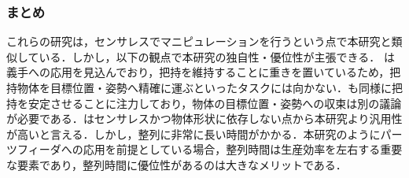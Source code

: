 \documentclass[a4paper,twoside,12pt,papersize, dvipdfmx]{iirthesis}
\begin{document}
\subsubsection{まとめ}
これらの研究は，センサレスでマニピュレーションを行うという点で本研究と類似している．しかし，以下の観点で本研究の独自性・優位性が主張できる．
\cite{ospina2020}は義手への応用を見込んでおり，把持を維持することに重きを置いているため，把持物体を目標位置・姿勢へ精確に運ぶといったタスクには向かない．\cite{tahara2013}\cite{tahara2020}も同様に把持を安定させることに注力しており，物体の目標位置・姿勢への収束は別の議論が必要である．\cite{mannam2019}はセンサレスかつ物体形状に依存しない点から本研究より汎用性が高いと言える．しかし，整列に非常に長い時間がかかる．本研究のようにパーツフィーダへの応用を前提としている場合，整列時間は生産効率を左右する重要な要素であり，整列時間に優位性があるのは大きなメリットである．
\end{document}
